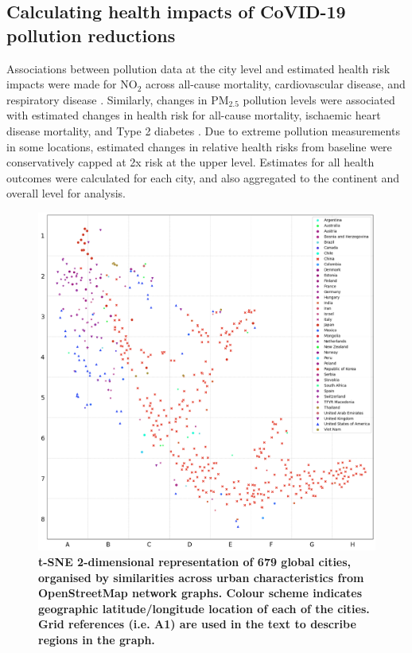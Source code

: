 \documentclass[preprint,10pt]{elsarticle} %
\begin{document}
\subsection*{Calculating health impacts of CoVID-19 pollution reductions}
Associations between pollution data at the city level and estimated health risk impacts were made for NO$_{2}$ across all-cause mortality, cardiovascular disease, and respiratory disease \cite{Huang19Pollution}. Similarly, changes in PM$_{2.5}$ pollution levels were associated with estimated changes in health risk for all-cause mortality, ischaemic heart disease mortality, and Type 2 diabetes \cite{Xie257, Yu2020PM2.5}. Due to extreme pollution measurements in some locations, estimated changes in relative health risks from baseline were conservatively capped at 2x risk at the upper level. Estimates for all health outcomes were calculated for each city, and also aggregated to the continent and overall level for analysis. 

\begin{figure}
\centering
\includegraphics[trim={ 0 0 0 0 },clip,scale=0.45]{Images/ByCountry_latlong_Zeigler.png}%
\caption{\bf t-SNE 2-dimensional representation of 679 global cities, organised by similarities across urban characteristics from OpenStreetMap network graphs. Colour scheme indicates geographic latitude/longitude location\cite{Jackle2017} of each of the cities. Grid references (i.e. A1) are used in the text to describe regions in the graph.}
 \label{fig:tSNE}
\end{figure}
\end{document}
